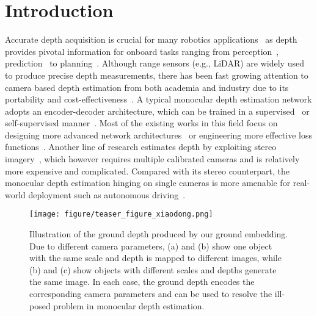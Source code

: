 \documentclass[10pt,twocolumn,letterpaper]{article}
\begin{document}
\section{Introduction}
\label{sec:intro}
Accurate depth acquisition is crucial for many robotics applications~\cite{luo2021simtrack,luo2021pillarmotion,tateno2017cnn,wang2019pseudo} as depth provides pivotal information for onboard tasks ranging from perception~\cite{li2023pillarnext}, prediction~\cite{wang2023prophnet} to planning~\cite{li2023tip}. Although range sensors (e.g., LiDAR) are widely used to produce precise depth measurements, there has been fast growing attention to camera based depth estimation from both academia and industry due to its portability and cost-effectiveness~\cite{bhat2021adabins, eigen2014depth, fu2018deep, yuan2022new}. A typical monocular depth estimation network adopts an encoder-decoder architecture, which can be trained in a supervised~\cite{eigen2014depth, fu2018deep} or self-supervised manner~\cite{godard2019digging, mahjourian2018unsupervised, zhou2017unsupervised}. Most of the existing works in this field focus on designing more advanced network architectures~\cite{bhat2021adabins,li2022depthformer} or engineering more effective loss functions~\cite{fu2018deep, long2021adaptive}.  
Another line of research estimates depth by exploiting stereo imagery~\cite{badki2020bi3d,kusupati2020normal}, which however requires multiple calibrated cameras and is relatively more expensive and complicated. Compared with its stereo counterpart, the monocular depth estimation hinging on single cameras is more amenable for real-world deployment such as autonomous driving~\cite{bevdepth,philion2020eccv}. 

\begin{figure}[t]
\centering
\texttt{[image: figure/teaser\_figure\_xiaodong.png]}
\caption{Illustration of the ground depth produced by our ground embedding. Due to different camera parameters, (a) and (b) show one object with the same scale and depth is mapped to different images, while (b) and (c) show objects with different scales and depths generate the same image. In each case, the ground depth encodes the corresponding camera parameters and can be used to resolve the ill-posed problem in monocular depth estimation.   
}
\label{fig:teaser_figure}
\end{figure}
\end{document}
